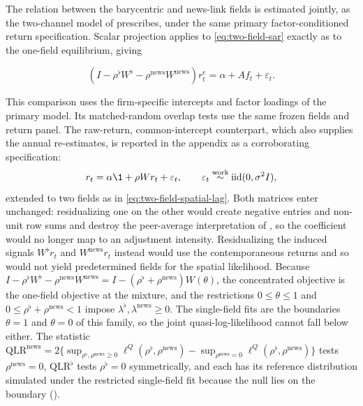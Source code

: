 The relation between the barycentric and news-link fields is estimated jointly,
as the two-channel model of  prescribes, under the
same primary factor-conditioned return specification.
Scalar projection applies to \eqref{eq:two-field-sar} exactly as to the
one-field equilibrium, giving

\begin{equation}\label{eq:two-field-spatial-lag}
  (I-\rho^\flat W^\flat-\rho^{\mathrm{news}} W^{\mathrm{news}})r_t^e
  =\alpha+A f_t+\varepsilon_t .
\end{equation}

This comparison uses the firm-specific intercepts and factor loadings of the
primary model. Its matched-random overlap tests use the same frozen fields and
return panel.
The raw-return, common-intercept counterpart, which also supplies the annual
re-estimates, is reported in the appendix as a corroborating specification:
\[
  r_t=\alpha\1+\rho W r_t+\varepsilon_t,
  \qquad \varepsilon_t\mathrel{\overset{\mathrm{work}}{\sim}}
  \mathrm{iid}(0,\sigma^2I),
\]
extended to two fields as in \eqref{eq:two-field-spatial-lag}.
Both matrices enter unchanged: residualizing one on the other would create
negative entries and non-unit row sums and destroy the peer-average
interpretation of , so the coefficient would no
longer map to an adjustment intensity.
Residualizing the induced signals $W^\flat r_t$ and $W^{\mathrm{news}}r_t$
instead would use the contemporaneous returns and so would not yield
predetermined fields for the spatial likelihood.
Because $I-\rho^\flat W^\flat-\rho^{\mathrm{news}}
W^{\mathrm{news}}=I-(\rho^\flat+\rho^{\mathrm{news}})W(\theta)$,
the concentrated objective is the one-field objective at the mixture, and the
restrictions $0\leq\theta\leq1$ and $0\leq\rho^\flat+\rho^{\mathrm{news}}<1$ impose
$\lambda^\flat,\lambda^{\mathrm{news}}\geq0$.
The single-field fits are the boundaries $\theta=1$ and $\theta=0$ of this
family, so the joint quasi-log-likelihood cannot fall below either.
The statistic
$\mathrm{QLR}^{\mathrm{news}}=2\{\sup_{\rho^\flat,\rho^{\mathrm{news}}\geq 0}
  \ell^Q(\rho^\flat,\rho^{\mathrm{news}})
-\sup_{\rho^{\mathrm{news}}=0}\ell^Q(\rho^\flat,\rho^{\mathrm{news}})\}$ tests
$\rho^{\mathrm{news}}=0$, $\mathrm{QLR}^\flat$ tests $\rho^\flat=0$
symmetrically, and each has its
reference distribution simulated under the restricted single-field fit because
the null lies on the boundary
().
